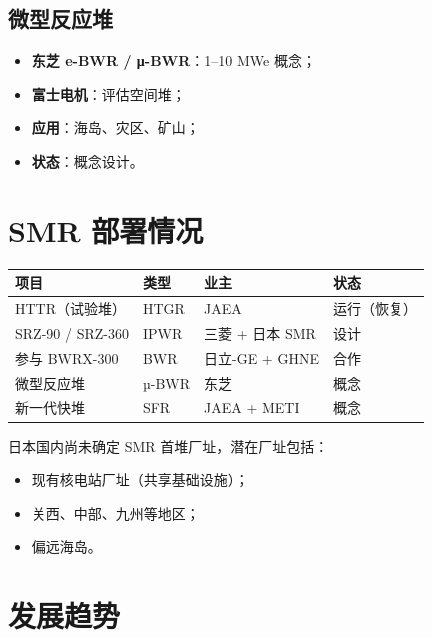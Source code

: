 \documentclass[
  UTF8,
  scheme=plain,
  fontsize=10pt,
  openany
]{ctexbook}
\begin{document}
\subsection{微型反应堆}\label{ux5faeux578bux53cdux5e94ux5806-2}

\begin{itemize}
\tightlist
\item
  \textbf{东芝 e-BWR / μ-BWR}：1--10 MWe 概念；
\item
  \textbf{富士电机}：评估空间堆；
\item
  \textbf{应用}：海岛、灾区、矿山；
\item
  \textbf{状态}：概念设计。
\end{itemize}

\section{SMR 部署情况}\label{smr-ux90e8ux7f72ux60c5ux51b5}

{\def\LTcaptype{none} %
\begin{longtable}[]{@{}llll@{}}
\toprule\noalign{}
项目 & 类型 & 业主 & 状态 \\
\midrule\noalign{}
\endhead
\bottomrule\noalign{}
\endlastfoot
HTTR（试验堆） & HTGR & JAEA & 运行（恢复） \\
SRZ-90 / SRZ-360 & IPWR & 三菱 + 日本 SMR & 设计 \\
参与 BWRX-300 & BWR & 日立-GE + GHNE & 合作 \\
微型反应堆 & µ-BWR & 东芝 & 概念 \\
新一代快堆 & SFR & JAEA + METI & 概念 \\
\end{longtable}
}

日本国内尚未确定 SMR 首堆厂址，潜在厂址包括：

\begin{itemize}
\tightlist
\item
  现有核电站厂址（共享基础设施）；
\item
  关西、中部、九州等地区；
\item
  偏远海岛。
\end{itemize}

\section{发展趋势}\label{ux53d1ux5c55ux8d8bux52bf-5}
\end{document}
